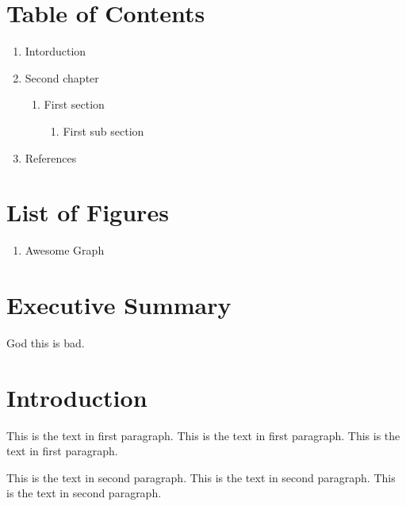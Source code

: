 \documentclass[12pt]{report}
\begin{document}
\newpage\thispagestyle{fancy}\sectionfont{\scshape}
\section*{Table of Contents}
\normalsize
\begin{enumerate}[label=\arabic*,leftmargin=*,labelsep=2ex,ref=\arabic*]
    \item Intorduction 
    \item Second chapter 
      \begin{enumerate}[label*=.\arabic*,leftmargin=*,labelsep=2ex]
        \item First section 
        \begin{enumerate}[label*=.\arabic*,leftmargin=*,labelsep=2ex]
        \item First sub section 
      \end{enumerate}
      \end{enumerate}
    \item References 
\end{enumerate}

\newpage\thispagestyle{fancy}\sectionfont{\scshape}
\section*{List of Figures}
\normalsize{}
\begin{enumerate}[label=\arabic*,leftmargin=*,labelsep=2ex,ref=\arabic*]
    \item Awesome Graph 
\end{enumerate}


\newpage\thispagestyle{fancy}\sectionfont{\scshape}
\section*{Executive Summary}
God this is bad.



\newpage\thispagestyle{fancy}\sectionfont{\scshape}

\setcounter{page}{1}
\fancyfoot[C]{\thepage}

\section*{Introduction}
\par\indent
This is the text in first paragraph. This is the text in first 
paragraph. This is the text in first paragraph.
\\ \par\noindent
This is the text in second paragraph. This is the text in second 
paragraph. This is the text in second paragraph.\\
\end{document}
